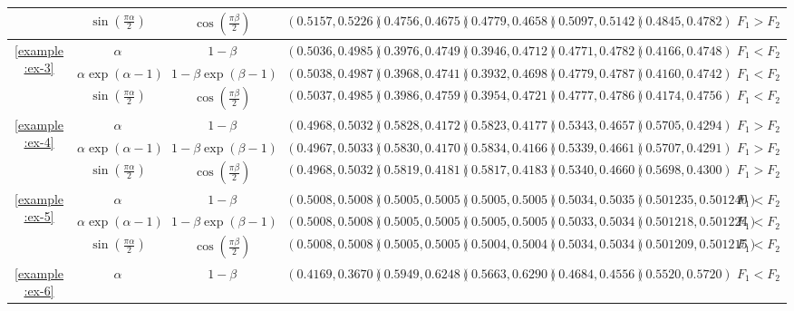 \begin{table}[tbh!]
{\begin{tabular}{ccccccccc}
		 & $\sin\left(\frac{\pi \alpha}{2}\right)$ & $\cos\left(\frac{\pi \beta}{2}\right)$ & $(0.5157, 0.5226)$ & $(0.4756, 0.4675)$ & $(0.4779, 0.4658)$ & $(0.5097, 0.5142)$ & $(0.4845, 0.4782)$ & $F_{1} > F_{2}$ \\
		\midrule
		\multirow{3}{*}{\ref{example:ex-3}} & $\alpha$ & $1 - \beta$ & $(0.5036, 0.4985)$ & $(0.3976, 0.4749)$ & $(0.3946, 0.4712)$ & $(0.4771, 0.4782)$ & $(0.4166, 0.4748)$ & $F_{1} < F_{2}$ \\
		 & $\alpha \exp(\alpha - 1)$ & $1 - \beta \exp(\beta - 1)$ & $(0.5038, 0.4987)$ & $(0.3968, 0.4741)$ & $(0.3932, 0.4698)$ & $(0.4779, 0.4787)$ & $(0.4160, 0.4742)$ & $F_{1} < F_{2}$ \\
		 & $\sin\left(\frac{\pi \alpha}{2}\right)$ & $\cos\left(\frac{\pi \beta}{2}\right)$ & $(0.5037, 0.4985)$ & $(0.3986, 0.4759)$ & $(0.3954, 0.4721)$ & $(0.4777, 0.4786)$ & $(0.4174, 0.4756)$ & $F_{1} < F_{2}$ \\
		\midrule
		\multirow{3}{*}{\ref{example:ex-4}} & $\alpha$ & $1 - \beta$ & $(0.4968, 0.5032)$ & $(0.5828, 0.4172)$ & $(0.5823, 0.4177)$ & $(0.5343, 0.4657)$ & $(0.5705, 0.4294)$ & $F_{1} > F_{2}$ \\
		 & $\alpha \exp(\alpha - 1)$ & $1 - \beta \exp(\beta - 1)$ & $(0.4967, 0.5033)$ & $(0.5830, 0.4170)$ & $(0.5834, 0.4166)$ & $(0.5339, 0.4661)$ & $(0.5707, 0.4291)$ & $F_{1} > F_{2}$ \\
		 & $\sin\left(\frac{\pi \alpha}{2}\right)$ & $\cos\left(\frac{\pi \beta}{2}\right)$ & $(0.4968, 0.5032)$ & $(0.5819, 0.4181)$ & $(0.5817, 0.4183)$ & $(0.5340, 0.4660)$ & $(0.5698, 0.4300)$ & $F_{1} > F_{2}$ \\
		\midrule
		\multirow{3}{*}{\ref{example:ex-5}} & $\alpha$ & $1 - \beta$ & $(0.5008, 0.5008)$ & $(0.5005, 0.5005)$ & $(0.5005, 0.5005)$ & $(0.5034, 0.5035)$ & $(0.501235, 0.501240)$ & $F_{1} < F_{2}$ \\
		 & $\alpha \exp(\alpha - 1)$ & $1 - \beta \exp(\beta - 1)$ & $(0.5008, 0.5008)$ & $(0.5005, 0.5005)$ & $(0.5005, 0.5005)$ & $(0.5033, 0.5034)$ & $(0.501218, 0.501224)$ & $F_{1} < F_{2}$ \\
		 & $\sin\left(\frac{\pi \alpha}{2}\right)$ & $\cos\left(\frac{\pi \beta}{2}\right)$ & $(0.5008, 0.5008)$ & $(0.5005, 0.5005)$ & $(0.5004, 0.5004)$ & $(0.5034, 0.5034)$ & $(0.501209, 0.501215)$ & $F_{1} < F_{2}$ \\
		\midrule
		\multirow{3}{*}{\ref{example:ex-6}} & $\alpha$ & $1 - \beta$ & $(0.4169, 0.3670)$ & $(0.5949, 0.6248)$ & $(0.5663, 0.6290)$ & $(0.4684, 0.4556)$ & $(0.5520, 0.5720)$ & $F_{1} < F_{2}$ \\

\end{tabular}}
\end{table}

